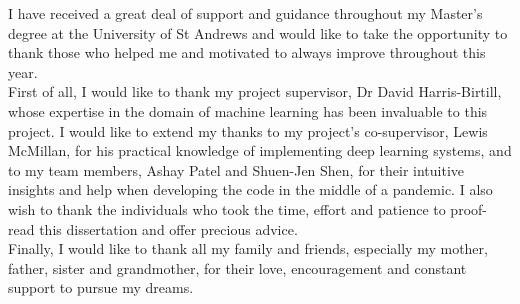I have received a great deal of support and guidance throughout my Master's degree at the University of St Andrews and would like to take the opportunity to thank those who helped me and motivated to always improve throughout this year.\\

First of all, I would like to thank my project supervisor, Dr David Harris-Birtill, whose expertise in the domain of machine learning has been invaluable to this project. I would like to extend my thanks to my project's co-supervisor, Lewis McMillan, for his practical knowledge of implementing deep learning systems, and to my team members, Ashay Patel and Shuen-Jen Shen, for their intuitive insights and help when developing the code in the middle of a pandemic. I also wish to thank the individuals who took the time, effort and patience to proof-read this dissertation and offer precious advice.\\

Finally, I would like to thank all my family and friends, especially my mother, father, sister and grandmother, for their love, encouragement and constant support to pursue my dreams.
